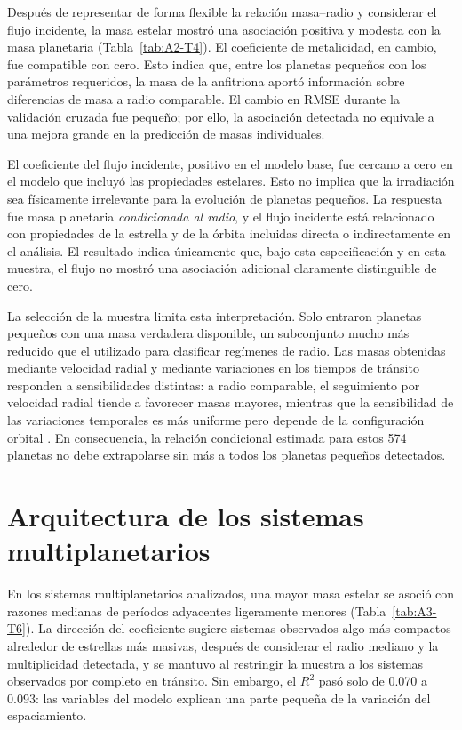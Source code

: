 Después de representar de forma flexible la relación masa--radio y considerar el flujo incidente, la masa estelar mostró una asociación positiva y modesta con la masa planetaria (Tabla~\ref{tab:A2-T4}). El coeficiente de metalicidad, en cambio, fue compatible con cero. Esto indica que, entre los planetas pequeños con los parámetros requeridos, la masa de la anfitriona aportó información sobre diferencias de masa a radio comparable. El cambio en RMSE durante la validación cruzada fue pequeño; por ello, la asociación detectada no equivale a una mejora grande en la predicción de masas individuales.

El coeficiente del flujo incidente, positivo en el modelo base, fue cercano a cero en el modelo que incluyó las propiedades estelares. Esto no implica que la irradiación sea físicamente irrelevante para la evolución de planetas pequeños. La respuesta fue masa planetaria \emph{condicionada al radio}, y el flujo incidente está relacionado con propiedades de la estrella y de la órbita incluidas directa o indirectamente en el análisis. El resultado indica únicamente que, bajo esta especificación y en esta muestra, el flujo no mostró una asociación adicional claramente distinguible de cero.

La selección de la muestra limita esta interpretación. Solo entraron planetas pequeños con una masa verdadera disponible, un subconjunto mucho más reducido que el utilizado para clasificar regímenes de radio. Las masas obtenidas mediante velocidad radial y mediante variaciones en los tiempos de tránsito responden a sensibilidades distintas: a radio comparable, el seguimiento por velocidad radial tiende a favorecer masas mayores, mientras que la sensibilidad de las variaciones temporales es más uniforme pero depende de la configuración orbital \parencite{steffen2016}. En consecuencia, la relación condicional estimada para estos 574 planetas no debe extrapolarse sin más a todos los planetas pequeños detectados.

\section{Arquitectura de los sistemas multiplanetarios}
\label{sec:dis-arquitectura}

En los sistemas multiplanetarios analizados, una mayor masa estelar se asoció con razones medianas de períodos adyacentes ligeramente menores (Tabla~\ref{tab:A3-T6}). La dirección del coeficiente sugiere sistemas observados algo más compactos alrededor de estrellas más masivas, después de considerar el radio mediano y la multiplicidad detectada, y se mantuvo al restringir la muestra a los sistemas observados por completo en tránsito. Sin embargo, el $R^2$ pasó solo de 0.070 a 0.093: las variables del modelo explican una parte pequeña de la variación del espaciamiento.

